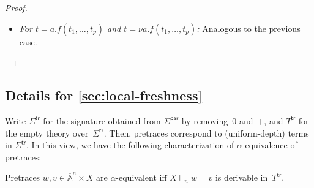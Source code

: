 \documentclass[a4paper,UKenglish,cleveref,thm-restate,numberwithinsect,final]{lipics-v2021}
\newcommand{\Br}{\mathsf{bar}}
\newcommand{\trc}{\mathsf{tr}}
\newcommand{\Names}{\mathbb{A}}
\newcommand{\barNames}{\overline{\Names}}
\theoremstyle{plain}
\numberwithin{equation}{section}
\newcommand{\+}[1]{\mathcal{#1}\xspace}
\theoremstyle{definition}
\begin{document}
\begin{proof}
\begin{enumerate}[wide]
\begin{itemize}
                    If \(d(f) = 1\), then
                    \begin{align*}
                        &q'([f(t_1, \ldots, t_p)]_{1 + n}) \\
                        =~&q'(\mu^{1, n}_X([f([t_1]_n, \ldots, [t_p]_n)]_1)) && \text{\cref{thm:multiplicationwithzero}} \\
                        =~&q([f([t_1]_n, \ldots, [t_p]_n)]_1) && \text{\cref{eq:qprimehasproperty}} \\
                        =~&q([s^n_X(f(t_1, \ldots, t_p)]_1) && \text{definition of } s^n_X \\
                        =~&\bar{q}([f(t_1, \ldots, t_p)]_{1 + n}) && \text{definition of } \bar{q}.
                    \end{align*}
                \item
                    \textit{For \(t = a.f(t_1, \ldots, t_p)\) and \(t = \nu a.f(t_1, \ldots, t_p)\):}
                    Analogous to the previous case.
            \end{itemize}
    \end{enumerate}

\end{proof}

\subsection*{Details for \cref{sec:local-freshness}}
Write $\Sigma^{\trc}$ for the signature obtained from $\Sigma^\Br$ by
removing~$0$ and~$+$, and $T^\trc$ for the empty theory
over~$\Sigma^\trc$. Then, pretraces correspond to (uniform-depth)
terms in $\Sigma^\trc$. In this view, we have the following
characterization of $\alpha$-equivalence of pretraces:

\begin{lemma}\label{lem:pretrace-alpha}
  Pretraces $w,v\in\barNames^n\times X$ are $\alpha$-equivalent iff
  $X\vdash_n w=v$ is derivable in~$T^\trc$.
\end{lemma}
\end{document}
